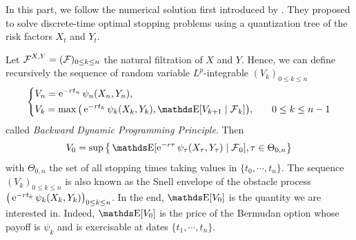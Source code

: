 In this part, we follow the numerical solution first introduced by \cite{printems2005quantization,bally2003quantization}. They proposed to solve discrete-time optimal stopping problems using a quantization tree of the risk factors $X_t$ and $Y_t$.

Let $\operatorname{\mathcal{F}}^{X,Y} = ( \operatorname{\mathcal{F}} )_{0 \leq k \leq n}$ the natural filtration of $X$ and $Y$. Hence, we can define recursively the sequence of random variable $L^p$-integrable $(V_k)_{0 \leq k \leq n}$
\begin{equation}\label{RH:BDPP}
	\left\{
	\begin{aligned}
		 & V_n = \e^{ - r t_n } \psi_n( X_n, Y_n ),                                                                            \\
		 & V_k = \max \big( \e^{ - r t_k } \psi_k(X_k, Y_k), \E [ V_{k+1} \mid \F_k ] \big) \mathrm{,\qquad} 0 \leq k \leq n-1
	\end{aligned} \right.
\end{equation}
called \textit{Backward Dynamic Programming Principle}. Then
\begin{equation*}
	V_0 = \sup \big\{ \E [ \e^{ - r \tau } \psi_\tau( X_\tau, Y_\tau ) \mid \F_0 ], \tau \in \Theta_{0,n} \big\}
\end{equation*}
with $\Theta_{0,n}$ the set of all stopping times taking values in $\{ t_0, \cdots, t_n \}$.
The sequence $(V_k)_{0 \leq k \leq n}$ is also known as the Snell envelope of the obstacle process $\big( \operatorname{e}^{ - r t_k } \psi_k(X_k, Y_k) \big)_{0 \leq k \leq n}$. In the end, $\E [ V_0 ]$ is the quantity we are interested in. Indeed, $\E [ V_0 ]$ is the price of the Bermudan option whose payoff is $\psi_k$ and is exercisable at dates $\{ t_1, \cdots, t_n \}$.

